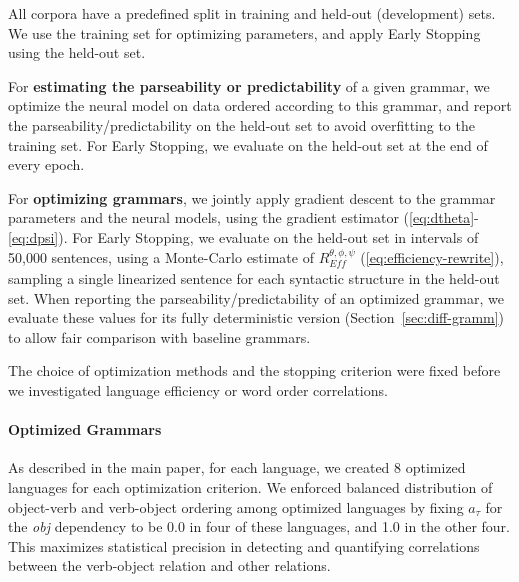 \documentclass[10pt,twoside,lineno]{article}
\newcommand{\key}[1]{\textbf{#1}}
\begin{document}
All corpora have a predefined split in training and held-out (development) sets.
We use the training set for optimizing parameters, and apply Early Stopping~\citep{prechelt1998early} using the held-out set.

For \key{estimating the parseability or predictability} of a given grammar, we optimize the neural model on data ordered according to this grammar, and report the parseability/predictability on the held-out set to avoid overfitting to the training set.
For Early Stopping, we evaluate on the held-out set at the end of every epoch. %

For \key{optimizing grammars}, we jointly apply gradient descent to the grammar parameters and the neural models, using the gradient estimator (\ref{eq:dtheta}-\ref{eq:dpsi}).
For Early Stopping, we evaluate on the held-out set in intervals of 50,000 sentences, using a Monte-Carlo estimate of $R_{\textit{Eff}}^{\theta, \phi, \psi}$ (\ref{eq:efficiency-rewrite}), sampling a single linearized sentence for each syntactic structure in the held-out set.
When reporting the parseability/predictability of an optimized grammar, we evaluate these values for its fully deterministic version (Section~\ref{sec:diff-gramm}) to allow fair comparison with baseline grammars.


The choice of optimization methods and the stopping criterion were fixed before we investigated language efficiency or word order correlations.

\paragraph{Optimized Grammars}
As described in the main paper, for each language, we created 8 optimized languages for each optimization criterion.
We enforced balanced distribution of object-verb and verb-object ordering among optimized languages by fixing $a_\tau$ for the \textit{obj} dependency to be 0.0 in four of these languages, and 1.0 in the other four.
This maximizes statistical precision in detecting and quantifying correlations between the verb-object relation and other relations.
\end{document}
